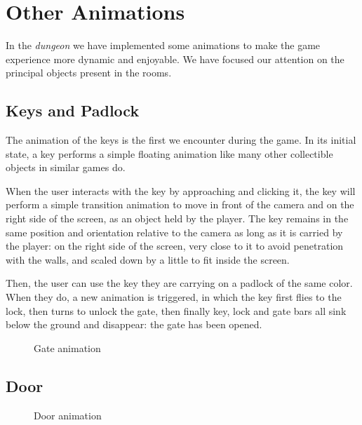 \section{Other Animations}
In the \textit{dungeon} we have implemented some animations to make the game experience more dynamic and enjoyable. We have focused our attention on the principal objects present in the rooms.

\subsection{Keys and Padlock}

The animation of the keys is the first we encounter during the game. In its initial state, a key performs a simple floating animation like many other collectible objects in similar games do.

When the user interacts with the key by approaching and clicking it, the key will perform a simple transition animation to move in front of the camera and on the right side of the screen, as an object held by the player. The key remains in the same position and orientation relative to the camera as long as it is carried by the player: on the right side of the screen, very close to it to avoid penetration with the walls, and scaled down by a little to fit inside the screen.

Then, the user can use the key they are carrying on a padlock of the same color. When they do, a new animation is triggered, in which the key first flies to the lock, then turns to unlock the gate, then finally key, lock and gate bars all sink below the ground and disappear: the gate has been opened.

\begin{figure}[H]
      \centering
    \hspace{1cm}
    \caption{Gate animation}
\end{figure}

\subsection{Door}

\begin{figure}
    \centering
    \caption{Door animation}
    \label{fig:door}
\end{figure}

